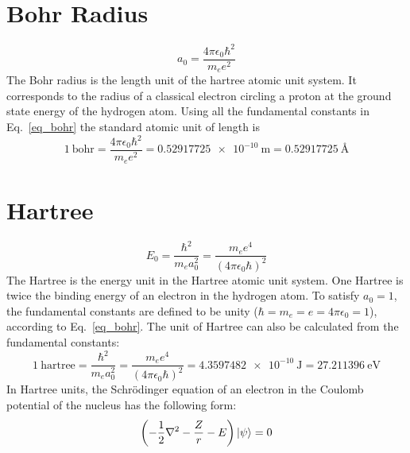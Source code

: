 \section{Bohr Radius}
\begin{equation}
\label{eq_bohr}
a_0 = \frac{4\pi\epsilon_0 \hbar^2}{m_ee^2}
\end{equation}
The Bohr radius is the length unit of the hartree atomic unit system. It corresponds to the radius of a classical electron circling a proton at the ground state energy of the hydrogen atom. Using all the fundamental constants in Eq.~\eqref{eq_bohr} the standard atomic unit of length is
\begin{equation}
1\ \text{bohr} = \frac{4\pi\epsilon_0 \hbar^2}{m_ee^2} = \num{0.52917725e-10}\ \text{m} = 0.52917725 \ \si{\angstrom}
\end{equation}


\section{Hartree}
\begin{equation}
\label{eq_htr}
 E_0= \frac{\hbar^2}{m_ea_0^2} = \frac{m_ee^4}{(4\pi\epsilon_0\hbar)^2}
\end{equation}
The Hartree is the energy unit in the Hartree atomic unit system. One Hartree is twice the binding energy of an electron in the hydrogen atom. To satisfy $a_0 = 1$, the fundamental constants are defined to be unity ($\hbar = m_e = e = 4\pi\epsilon_0 = 1$), according to Eq.~\eqref{eq_bohr}. The unit of Hartree can also be calculated from the fundamental constants:
\begin{equation}
1\ \text{hartree} = \frac{\hbar^2}{m_ea_0^2} = \frac{m_ee^4}{(4\pi\epsilon_0\hbar)^2} = \num{4.3597482e-10}~\mathrm{J} = 27.211396~\mathrm{eV}
\end{equation}
In Hartree units, the Schr\"odinger equation of an electron in the Coulomb potential of the nucleus has the following form:
\begin{equation}
\left(-\frac{1}{2}\nabla^2 - \frac{Z}{r} - E \right) \ket{\psi} = 0
\end{equation}

